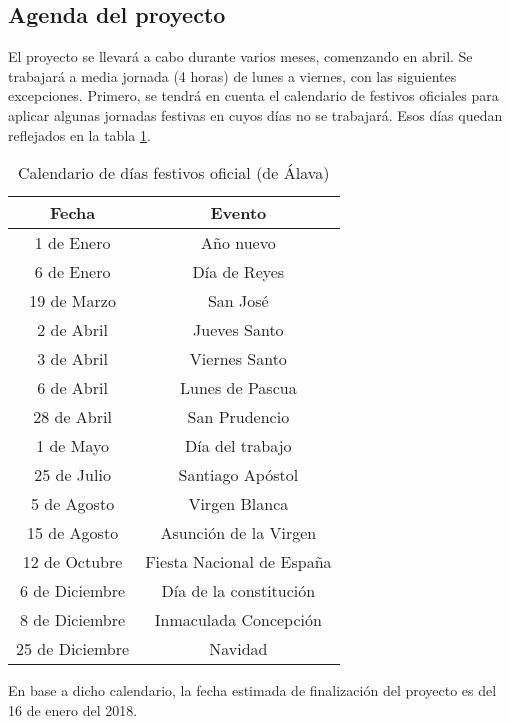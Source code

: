 \subsection{Agenda del proyecto}
El proyecto se llevará a cabo durante varios meses, comenzando en abril. Se trabajará a media jornada (4 horas) de lunes a viernes, con las siguientes excepciones. Primero, se tendrá en cuenta el calendario de festivos oficiales para aplicar algunas jornadas festivas en cuyos días no se trabajará. Esos días quedan reflejados en la tabla \ref{table:festivos-oficiales}.

\begin{table}[H]
	\centering
	\begin{tabular}{ |c|c| } 
		\hline
		Fecha & Evento \\
		\hline
		1 de Enero & Año nuevo \\
		6 de Enero & Día de Reyes \\
		19 de Marzo & San José \\
		2 de Abril & Jueves Santo \\
		3 de Abril & Viernes Santo \\
		6 de Abril & Lunes de Pascua \\
		28 de Abril & San Prudencio \\
		1 de Mayo & Día del trabajo \\
		25 de Julio & Santiago Apóstol \\
		5 de Agosto & Virgen Blanca \\
		15 de Agosto & Asunción de la Virgen \\
		12 de Octubre & Fiesta Nacional de España \\
		6 de Diciembre & Día de la constitución \\
		8 de Diciembre & Inmaculada Concepción \\
		25 de Diciembre & Navidad \\
		\hline
	\end{tabular}
	\caption{Calendario de días festivos oficial (de Álava)}
	\label{table:festivos-oficiales}
\end{table}

En base a dicho calendario, la fecha estimada de finalización del proyecto es del 16 de enero del 2018.

